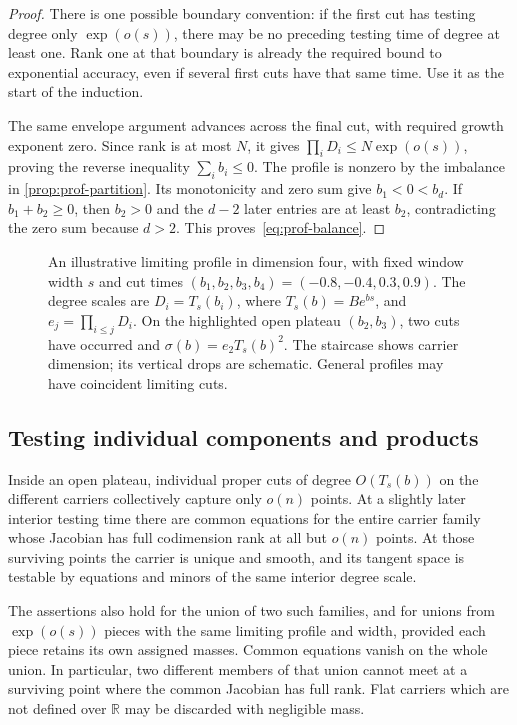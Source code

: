 \begin{proof}
There is one possible boundary convention: if the first cut has testing degree only $\exp(o(s))$, there may be no preceding testing time of degree at least one.  Rank one at that boundary is already the required bound to exponential accuracy, even if several first cuts have that same time.  Use it as the start of the induction.

The same envelope argument advances across the final cut, with required growth exponent zero.  Since rank is at most $N$, it gives $\prod_iD_i\le N\exp(o(s))$, proving the reverse inequality $\sum_i b_i\le0$.  The profile is nonzero by the imbalance in \cref{prop:prof-partition}.  Its monotonicity and zero sum give $b_1<0<b_d$.  If $b_1+b_2\ge0$, then $b_2>0$ and the $d-2$ later entries are at least $b_2$, contradicting the zero sum because $d>2$.  This proves~\eqref{eq:prof-balance}.
\end{proof}

\begin{figure}[htbp]
\centering

\caption{An illustrative limiting profile in dimension four, with fixed
window width $s$ and cut times $(b_1,b_2,b_3,b_4)=(-0.8,-0.4,0.3,0.9)$.
The degree scales are $D_i=T_s(b_i)$, where $T_s(b)=B e^{bs}$, and
$e_j=\prod_{i\le j}D_i$. On the highlighted open plateau $(b_2,b_3)$,
two cuts have occurred and $\sigma(b)=e_2T_s(b)^2$.
The staircase shows carrier dimension; its vertical drops are schematic.
General profiles may have coincident limiting cuts.}
\label{fig:scale-profile}
\end{figure}
\FloatBarrier

\subsection{Testing individual components and products}

\begin{proposition}\label{prop:prof-regularity}
Inside an open plateau, individual proper cuts of degree $O(T_s(b))$ on the different carriers collectively capture only $o(n)$ points. At a slightly later interior testing time there are common equations for the entire carrier family whose Jacobian has full codimension rank at all but $o(n)$ points.  At those surviving points the carrier is unique and smooth, and its tangent space is testable by equations and minors of the same interior degree scale.

The assertions also hold for the union of two such families, and for unions from $\exp(o(s))$ pieces with the same limiting profile and width, provided each piece retains its own assigned masses. Common equations vanish on the whole union.  In particular, two different members of that union cannot meet at a surviving point where the common Jacobian has full rank. Flat carriers which are not defined over $\mathbb{R}$ may be discarded with negligible mass.
\end{proposition}

